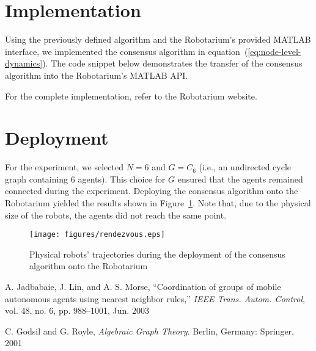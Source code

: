 \documentclass{article}
\begin{document}
\section{Implementation} 

Using the previously defined algorithm and the Robotarium's provided MATLAB interface, we implemented the consensus algorithm in equation~(\ref{eq:node-level-dynamics}).  The code snippet below demonstrates the transfer of the consensus algorithm into the Robotarium's MATLAB API.

For the complete implementation, refer to the Robotarium website.  

\section{Deployment}
For the experiment, we selected $N = 6$ and $G = C_{6}$ (i.e., an undirected cycle graph containing 6 agents).  This choice for $G$ ensured that the agents remained connected during the experiment.  Deploying the consensus algorithm onto the Robotarium yielded the results shown in Figure~\ref{fig:consensus-data}.  Note that, due to the physical size of the robots, the agents did not reach the same point.
\begin{figure}[!ht]
    \centering
    \texttt{[image: figures/rendezvous.eps]}
    \caption{Physical robots' trajectories during the deployment of the consensus algorithm onto the Robotarium}
    \label{fig:consensus-data}
\end{figure}

\newpage 

\begin{thebibliography}{9}

A. Jadbabaie, J. Lin, and A. S. Morse, “Coordination of groups of mobile
autonomous agents using nearest neighbor rules,” \textit{IEEE Trans. Autom. Control}, vol. 48, no. 6, pp. 988–1001, Jun. 2003

C. Godsil and G. Royle, \textit{Algebraic Graph Theory}. Berlin, Germany:
Springer, 2001

\end{thebibliography}
\end{document}
